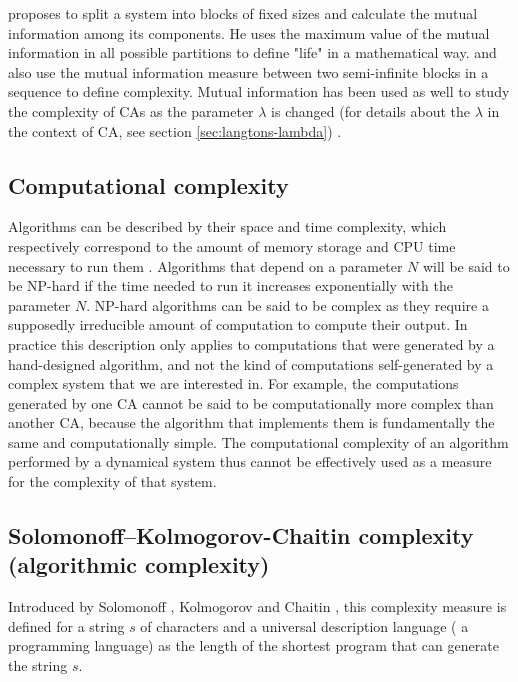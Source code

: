 \textcite{chaitinMathematicalDefinitionLife1987} proposes to split a system into
blocks of fixed sizes and calculate the mutual information among its components.
He uses the maximum value of the mutual information in all possible partitions
to define "life" in a mathematical way. \textcite{shawDrippingFaucetModel1984}
and \textcite{grassbergerQuantitativeTheorySelfgenerated1986} also use the
mutual information measure between two semi-infinite blocks in a sequence to
define complexity. Mutual information has been used as well to study the
complexity of \acp{CA} as the parameter $\lambda$ is changed (for details
about the $\lambda$ in the context of \ac{CA}, see section \ref{sec:langtons-lambda})
\parencite{gutowitzMethodsDesigningCellular1988,
  liTransitionPhenomenaCellular1990}.


\subsection{Computational complexity}
Algorithms can be described by their space and time complexity, which
respectively correspond to the amount of memory storage and CPU time necessary
to run them \parencite{traubInformationUncertaintyComplexity1983,
  packelRecentDevelopmentsInformationbased1987,
  hopcroftIntroductionAutomataTheory2007}. Algorithms that depend on a parameter
$N$ will be said to be NP-hard if the time needed to run it increases
exponentially with the parameter $N$. NP-hard algorithms can be said to be
complex as they require a supposedly irreducible amount of computation to
compute their output. In practice this description only applies to computations
that were generated by a hand-designed algorithm, and not the kind of
computations self-generated by a complex system that we are interested in. For
example, the computations generated by one \ac{CA} cannot be said to be
computationally more complex than another \ac{CA}, because the algorithm that
implements them is fundamentally the same and computationally simple. The
computational complexity of an algorithm performed by a dynamical system thus
cannot be effectively used as a measure for the complexity of that system.

\subsection{Solomonoff–Kolmogorov-Chaitin complexity (algorithmic
  complexity)}\label{sec:algo-complexity}

Introduced by Solomonoff \parencite{solomonoffPreliminaryReportGeneral1960},
Kolmogorov \parencite{kolmogorovThreeApproachesQuantitative1968} and Chaitin
\parencite{chaitinLengthProgramsComputing1969,
  chaitinAlgorithmicInformationTheory1977,
  chaitinInformationRandomnessIncompleteness1990}, this complexity measure is
defined for a string $s$ of characters and a universal description language (\eg
a programming language) as the length of the shortest program that can generate
the string $s$.

